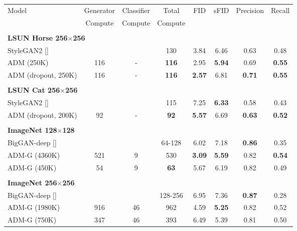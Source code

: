 \documentclass{article}
\newcommand{\shortcite}[1]{[\citenum{#1}]}
\begin{document}
\begin{table}[h]
    \setlength\tabcolsep{3.5pt}
    \begin{center}
    \begin{small}
    \begin{tabular}{lccccccc}
    \toprule
    Model & Generator & Classifier & Total   & FID & sFID & Precision & Recall \\
          & Compute    & Compute  & Compute &     &      &           &        \\
    \toprule
    \\
    \multicolumn{6}{l}{\bf{LSUN Horse} 256$\times$256} \\
    \toprule
    StyleGAN2 \shortcite{stylegan2}  & & & 130 & 3.84          & 6.46      &  0.63      & 0.48 \\
    ADM (250K)       & 116 & - & \bf{116} & 2.95          & \bf{5.94} &  0.69      & \bf{0.55} \\
    ADM (dropout, 250K)                     & 116 & - & \bf{116} & \bf{2.57}    & 6.81 &  \bf{0.71}  & \bf{0.55} \\
    \\
    \multicolumn{6}{l}{\bf{LSUN Cat} 256$\times$256} \\
    \toprule
    StyleGAN2 \shortcite{stylegan2}  & & & 115 & 7.25          & \bf{6.33} &  0.58      & 0.43 \\
    ADM (dropout, 200K)                     & 92  & - & \bf{92} & \bf{5.57}    & 6.69      &  \bf{0.63}  & \bf{0.52} \\
    \\
    \multicolumn{6}{l}{\bf{ImageNet} 128$\times$128} \\
    \toprule
    BigGAN-deep \shortcite{biggan}  & & & 64-128 & 6.02      & 7.18      & \bf{0.86} & 0.35 \\
    ADM-G (4360K)                   & 521 & 9 & 530       & \bf 3.09 & \bf 5.59 & 0.82 & \bf 0.54 \\
    ADM-G (450K)                    & 54 & 9 & \bf{63} & 5.67 & 6.19 & 0.82 & 0.49 \\    
    \\
    \multicolumn{6}{l}{\bf{ImageNet} 256$\times$256} \\
    \toprule
    BigGAN-deep \shortcite{biggan}  &     &    & 128-256  & 6.95      & 7.36      & \bf{0.87}& 0.28 \\
    ADM-G (1980K)                   & 916 & 46 & 962      & 4.59      & \bf{5.25} & 0.82     & 0.52 \\
    ADM-G (750K)                    & 347 & 46 & 393      & 6.49      & 5.39      & 0.81     & 0.50 \\

\end{tabular}
\end{small}
\end{center}
\end{table}
\end{document}
